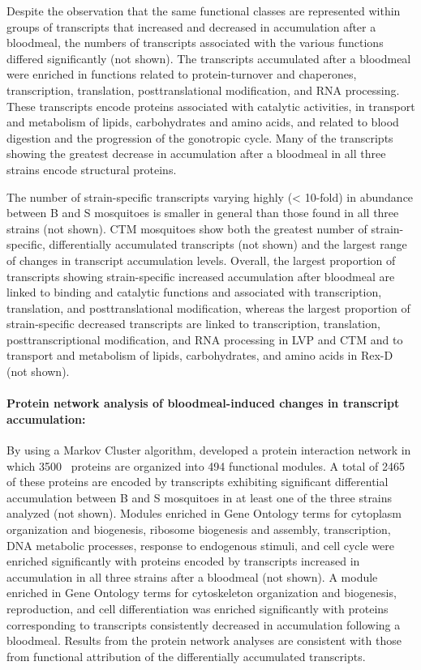 Despite the observation that the same functional classes are represented within groups of transcripts that increased and decreased in accumulation after a bloodmeal, the numbers of transcripts associated with the various functions differed significantly (not shown).
The transcripts accumulated after a bloodmeal were enriched in functions related to protein-turnover and chaperones, transcription, translation, posttranslational modification, and RNA processing.
These transcripts encode proteins associated with catalytic activities, in transport and metabolism of lipids, carbohydrates and amino acids, and related to blood digestion and the progression of the gonotropic cycle.
Many of the transcripts showing the greatest decrease in accumulation after a bloodmeal in all three strains encode structural proteins.

The number of strain-specific transcripts varying highly (< 10-fold) in abundance between B and S mosquitoes is smaller in general than those found in all three strains (not shown).
\gls{CTM} mosquitoes show both the greatest number of strain-specific, differentially accumulated transcripts (not shown) and the largest range of changes in transcript accumulation levels.
Overall, the largest proportion of transcripts showing strain-specific increased accumulation after bloodmeal are linked to binding and catalytic functions and associated with transcription, translation, and posttranslational modification, whereas the largest proportion of strain-specific decreased transcripts are linked to transcription, translation, posttranscriptional modification, and RNA processing in \gls{LVP} and \gls{CTM} and to transport and metabolism of lipids, carbohydrates, and amino acids in \gls{Rex-D} (not shown).


\paragraph*{Protein network analysis of bloodmeal-induced changes in transcript accumulation:}

By using a Markov Cluster algorithm, \citet{Guo2010} developed a protein interaction network in which 3500 \Aa\ proteins are organized into 494 functional modules.
A total of 2465 of these proteins are encoded by transcripts exhibiting significant differential accumulation between B and S mosquitoes in at least one of the three strains analyzed (not shown).
Modules enriched in Gene Ontology terms for cytoplasm organization and biogenesis, ribosome biogenesis and assembly, transcription, DNA metabolic processes, response to endogenous stimuli, and cell cycle were enriched significantly with proteins encoded by transcripts increased in accumulation in all three strains after a bloodmeal (not shown).
A module enriched in Gene Ontology terms for cytoskeleton organization and biogenesis, reproduction, and cell differentiation was enriched significantly with proteins corresponding to transcripts consistently decreased in accumulation following a bloodmeal.
Results from the protein network analyses are consistent with those from functional attribution of the differentially accumulated transcripts.

